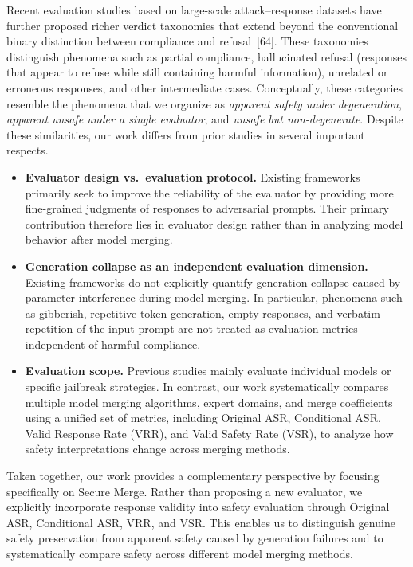 \documentclass{article}
\begin{document}
Recent evaluation studies based on large-scale attack--response datasets have further proposed richer verdict taxonomies that extend beyond the conventional binary distinction between compliance and refusal~[64]. These taxonomies distinguish phenomena such as partial compliance, hallucinated refusal (responses that appear to refuse while still containing harmful information), unrelated or erroneous responses, and other intermediate cases. Conceptually, these categories resemble the phenomena that we organize as \emph{apparent safety under degeneration}, \emph{apparent unsafe under a single evaluator}, and \emph{unsafe but non-degenerate}.
Despite these similarities, our work differs from prior studies in several important respects.

\begin{itemize}
    \item \textbf{Evaluator design vs.\ evaluation protocol.}
    Existing frameworks primarily seek to improve the reliability of the evaluator by providing more fine-grained judgments of responses to adversarial prompts. Their primary contribution therefore lies in evaluator design rather than in analyzing model behavior after model merging.

    \item \textbf{Generation collapse as an independent evaluation dimension.}
    Existing frameworks do not explicitly quantify generation collapse caused by parameter interference during model merging. In particular, phenomena such as gibberish, repetitive token generation, empty responses, and verbatim repetition of the input prompt are not treated as evaluation metrics independent of harmful compliance.

    \item \textbf{Evaluation scope.}
    Previous studies mainly evaluate individual models or specific jailbreak strategies. In contrast, our work systematically compares multiple model merging algorithms, expert domains, and merge coefficients using a unified set of metrics, including Original ASR, Conditional ASR, Valid Response Rate (VRR), and Valid Safety Rate (VSR), to analyze how safety interpretations change across merging methods.
\end{itemize}

Taken together, our work provides a complementary perspective by focusing specifically on Secure Merge. Rather than proposing a new evaluator, we explicitly incorporate response validity into safety evaluation through Original ASR, Conditional ASR, VRR, and VSR. This enables us to distinguish genuine safety preservation from apparent safety caused by generation failures and to systematically compare safety across different model merging methods.
\end{document}
